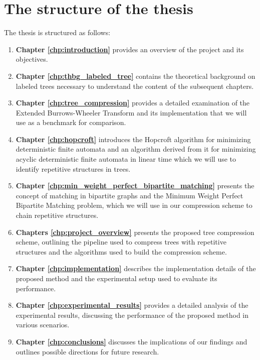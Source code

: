 \section{The structure of the thesis}
The thesis is structured as follows:
\begin{enumerate}
    \item \textbf{Chapter \ref{chp:introduction}} provides an overview of the project and its objectives.
    \item \textbf{Chapter \ref{chp:thbg_labeled_tree}} contains the theoretical background on labeled trees necessary to understand the content of the subsequent chapters.
    \item \textbf{Chapter \ref{chp:tree_compression}} provides a detailed examination of the Extended Burrows-Wheeler Transform and its implementation that we will use as a benchmark for comparison.
    \item \textbf{Chapter \ref{chp:hopcroft}} introduces the Hopcroft algorithm for minimizing deterministic finite automata and an algorithm derived from it for minimizing acyclic deterministic finite automata in linear time which we will use to identify repetitive structures in trees.
    \item \textbf{Chapter \ref{chp:min_weight_perfect_bipartite_matching}} presents the concept of matching in bipartite graphs and the Minimum Weight Perfect Bipartite Matching problem, which we will use in our compression scheme to chain repetitive structures.
    \item \textbf{Chapters \ref{chp:project_overview}} presents the proposed tree compression scheme, outlining the pipeline used to compress trees with repetitive structures and the algorithms used to build the compression scheme.
    \item \textbf{Chapter \ref{chp:implementation}} describes the implementation details of the proposed method and the experimental setup used to evaluate its performance.
    \item \textbf{Chapter \ref{chp:experimental_results}} provides a detailed analysis of the experimental results, discussing the performance of the proposed method in various scenarios.
    \item \textbf{Chapter \ref{chp:conclusions}} discusses the implications of our findings and outlines possible directions for future research.
\end{enumerate}